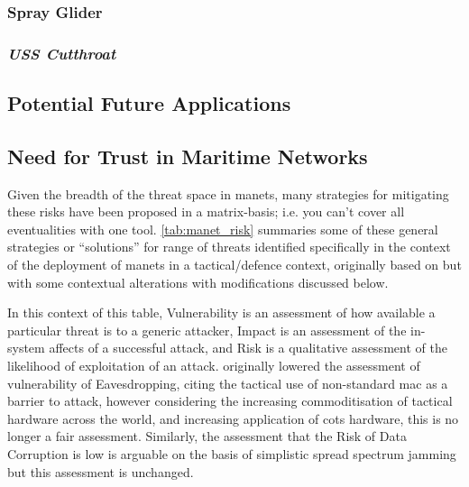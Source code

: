 \subsubsection{Spray Glider}
\subsubsection{\emph{USS Cutthroat}}

\subsection{Potential Future Applications}

\subsection{Need for Trust in Maritime Networks}\label{sec:trust_in_marine}


Given the breadth of the threat space in \glspl{manet}, many strategies for mitigating these risks have been proposed in a matrix-basis; i.e. you can't cover all eventualities with one tool.
\autoref{tab:manet_risk} summaries some of these general strategies or ``solutions'' for range of threats identified specifically in the context of the deployment of \glspl{manet} in a tactical/defence context, originally based on \citet{Kidston2010} but with some contextual alterations with modifications discussed below.

In this context of this table, Vulnerability is an assessment of how available a particular threat is to a generic attacker, Impact is an assessment of the in-system affects of a successful attack, and Risk is a qualitative assessment of the likelihood of exploitation of an attack.
\citet{Kidston2010} originally lowered the assessment of vulnerability of Eavesdropping, citing the tactical use of non-standard \gls{mac} as a barrier to attack, however considering the increasing commoditisation of tactical hardware across the world, and increasing application of \gls{cots} hardware, this is no longer a fair assessment.
Similarly, the assessment that the Risk of Data Corruption is low is arguable on the basis of simplistic spread spectrum jamming but this assessment is unchanged.

